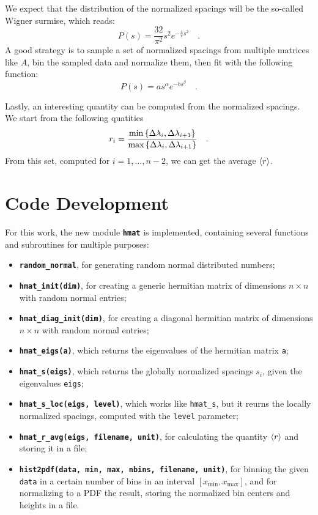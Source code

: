 \documentclass[pra, onecolumn, notitlepage, floats, 11pt]{revtex4-1}
\newcommand{\codebold}[2][cobalt]{\texttt{\bfseries {\color{#1}#2}}}
\newcommand{\code}[2][black]{\color{#1}\texttt{#2}}
\newcommand{\codefunctionbold}[2]{\texttt{\bfseries {\color{cobalt}#1}({\color{lava}#2})}}
\begin{document}
We expect that the distribution of the normalized spacings will be the so-called Wigner surmise, which reads:
\begin{equation}
    P(s)
    =
    \frac{32}{\pi^2} s^2 e^{-\frac{4}{\pi} s^2}
    \quad .
    \label{eq:05_T_2}
\end{equation}
A good strategy is to sample a set of normalized spacings from multiple matrices like \( A \), bin the sampled data and normalize them, then fit with the following function:
\begin{equation}
    P(s)
    =
    a s^{\alpha} e^{-b s^{\beta}}
    \quad .
    \label{eq:05_T_3}
\end{equation}

Lastly, an interesting quantity can be computed from the normalized spacings. We start from the following quatities
\begin{equation}
    r_{i}
    =
    \frac{\min\qty{\Delta\lambda_{i}, \Delta\lambda_{i+1}}}{\max\qty{\Delta\lambda_{i}, \Delta\lambda_{i+1}}}
    \quad .
    \label{eq:05_T_4}
\end{equation}
From this set, computed for \( i = 1, \dots, n-2 \), we can get the average \( \expval{r} \).





\section{Code Development}
For this work, the new module \codebold{hmat} is implemented, containing several functions and subroutines for multiple purposes:
\begin{itemize}
    \item \codebold{random\_normal}, for generating random normal distributed numbers;
    \item \codefunctionbold{hmat\_init}{dim}, for creating a generic hermitian matrix of dimensions \( n \times n \) with random normal entries;
    \item \codefunctionbold{hmat\_diag\_init}{dim}, for creating a diagonal hermitian matrix of dimensions \( n \times n \) with random normal entries;
    \item \codefunctionbold{hmat\_eigs}{a}, which returns the eigenvalues of the hermitian matrix \code{a};
    \item \codefunctionbold{hmat\_s}{eigs}, which returns the globally normalized spacings \( s_{i} \), given the eigenvalues \code{eigs};
    \item \codefunctionbold{hmat\_s\_loc}{eigs, level}, which works like \code{hmat\_s}, but it reurns the locally normalized spacings, computed with the \code{level} parameter;
    \item \codefunctionbold{hmat\_r\_avg}{eigs, filename, unit}, for calculating the quantity \( \expval{r} \) and storing it in a file;
    \item \codefunctionbold{hist2pdf}{data, min, max, nbins, filename, unit}, for binning the given \code{data} in a certain number of bins in an interval \( [x_{\mathrm{min}}, x_{\mathrm{max}}] \), and for normalizing to a PDF the result, storing the normalized bin centers and heights in a file.
\end{itemize}
\end{document}
